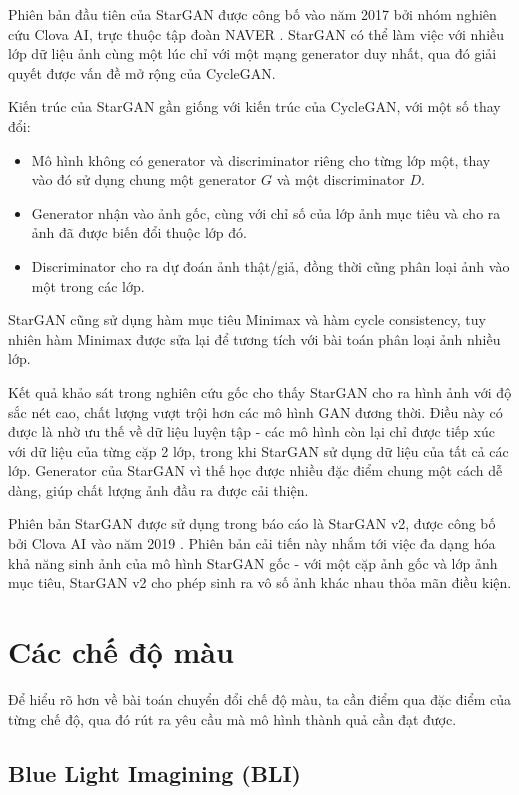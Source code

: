 \documentclass[12pt]{extreport}
\begin{document}
Phiên bản đầu tiên của StarGAN được công bố vào năm 2017 bởi nhóm nghiên cứu Clova AI, trực thuộc tập đoàn NAVER \cite{DBLP:journals/corr/abs-1711-09020}. StarGAN có thể làm việc với nhiều lớp dữ liệu ảnh cùng một lúc chỉ với một mạng generator duy nhất, qua đó giải quyết được vấn đề mở rộng của CycleGAN.

Kiến trúc của StarGAN gần giống với kiến trúc của CycleGAN, với một số thay đổi:
\begin{itemize}
    \item Mô hình không có generator và discriminator riêng cho từng lớp một, thay vào đó sử dụng chung một generator $ G $ và một discriminator $ D $.
    \item Generator nhận vào ảnh gốc, cùng với chỉ số của lớp ảnh mục tiêu và cho ra ảnh đã được biến đổi thuộc lớp đó.
    \item Discriminator cho ra dự đoán ảnh thật/giả, đồng thời cũng phân loại ảnh vào một trong các lớp.
\end{itemize}

StarGAN cũng sử dụng hàm mục tiêu Minimax và hàm cycle consistency, tuy nhiên hàm Minimax được sửa lại để tương tích với bài toán phân loại ảnh nhiều lớp.

Kết quả khảo sát trong nghiên cứu gốc cho thấy StarGAN cho ra hình ảnh với độ sắc nét cao, chất lượng vượt trội hơn các mô hình GAN đương thời. Điều này có được là nhờ ưu thế về dữ liệu luyện tập - các mô hình còn lại chỉ được tiếp xúc với dữ liệu của từng cặp 2 lớp, trong khi StarGAN sử dụng dữ liệu của tất cả các lớp. Generator của StarGAN vì thế học được nhiều đặc điểm chung một cách dễ dàng, giúp chất lượng ảnh đầu ra được cải thiện.

Phiên bản StarGAN được sử dụng trong báo cáo là StarGAN v2, được công bố bởi Clova AI vào năm 2019 \cite{DBLP:journals/corr/abs-1912-01865}. Phiên bản cải tiến này nhắm tới việc đa dạng hóa khả năng sinh ảnh của mô hình StarGAN gốc - với một cặp ảnh gốc và lớp ảnh mục tiêu, StarGAN v2 cho phép sinh ra vô số ảnh khác nhau thỏa mãn điều kiện.

\section{Các chế độ màu}

Để hiểu rõ hơn về bài toán chuyển đổi chế độ màu, ta cần điểm qua đặc điểm của từng chế độ, qua đó rút ra yêu cầu mà mô hình thành quả cần đạt được.

\subsection{Blue Light Imagining (BLI)}
\end{document}
